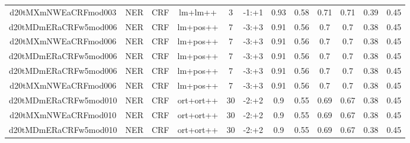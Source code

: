 \documentclass[a4paper]{article}
\begin{document}
\begin{landscape}
\begin{center}
\begin{tabular}{ |c|c|c|c|c|c|c|c|c|c|c|c|}
 	
 
 	
 		
 		\small{ d20tMXmNWEaCRFmod003 } & NER & CRF & lm+lm++  &  3 &  -1:+1  &  0.93 & 0.58 & 0.71  &  0.71 & 0.39 & 0.45 \\
 		

 	
 
 	
 		
 		\small{ d20tMDmERaCRFw5mod006 } & NER & CRF & lm+pos++  &  7 &  -3:+3  &  0.91 & 0.56 & 0.7  &  0.7 & 0.38 & 0.45 \\
 		

 	
 
 	
 		
 		\small{ d20tMXmNWEaCRFmod006 } & NER & CRF & lm+pos++  &  7 &  -3:+3  &  0.91 & 0.56 & 0.7  &  0.7 & 0.38 & 0.45 \\
 		

 	
 
 	
 		
 		\small{ d20tMDmERaCRFw5mod006 } & NER & CRF & lm+pos++  &  7 &  -3:+3  &  0.91 & 0.56 & 0.7  &  0.7 & 0.38 & 0.45 \\
 		

 	
 
 	
 		
 		\small{ d20tMDmERaCRFw5mod006 } & NER & CRF & lm+pos++  &  7 &  -3:+3  &  0.91 & 0.56 & 0.7  &  0.7 & 0.38 & 0.45 \\
 		

 	
 
 	
 		
 		\small{ d20tMXmNWEaCRFmod006 } & NER & CRF & lm+pos++  &  7 &  -3:+3  &  0.91 & 0.56 & 0.7  &  0.7 & 0.38 & 0.45 \\
 		

 	
 
 	
 		
 		\small{ d20tMDmERaCRFw5mod010 } & NER & CRF & ort+ort++  &  30 &  -2:+2  &  0.9 & 0.55 & 0.69  &  0.67 & 0.38 & 0.45 \\
 		

 	
 
 	
 		
 		\small{ d20tMXmNWEaCRFmod010 } & NER & CRF & ort+ort++  &  30 &  -2:+2  &  0.9 & 0.55 & 0.69  &  0.67 & 0.38 & 0.45 \\
 		

 	
 
 	
 		
 		\small{ d20tMDmERaCRFw5mod010 } & NER & CRF & ort+ort++  &  30 &  -2:+2  &  0.9 & 0.55 & 0.69  &  0.67 & 0.38 & 0.45 \\
 		


\end{tabular}
\end{center}
\end{landscape}
\end{document}
